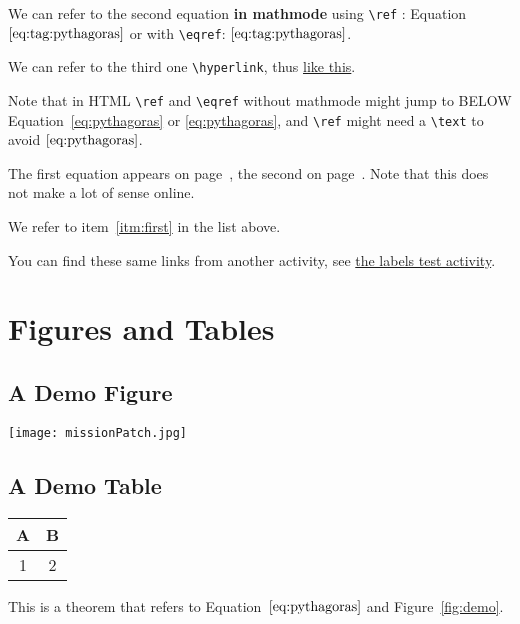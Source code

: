 \documentclass{ximera}
\begin{document}
We can refer to the second equation \textbf{in mathmode} using \verb|\ref| : Equation~$\text{\ref{eq:tag:pythagoras}}$ or with \verb|\eqref|: $\eqref{eq:tag:pythagoras}$.

We can refer to the third one  \verb|\hyperlink|, thus \hyperlink{ht:pythagoras}{like this}.

Note that in HTML \verb|\ref| and \verb|\eqref| without mathmode might jump to BELOW Equation~\ref{eq:pythagoras} or \eqref{eq:pythagoras}, and
\verb|\ref| might need a \verb|\text| to avoid $\ref{eq:pythagoras}$.

The first equation appears on page~\pageref{eq:pythagoras}, the second on page~\pageref{eq:tag:pythagoras}. 
Note that this does not make a lot of sense online.

We refer to item~\ref{itm:first} in the list above.

You can find these same links from another activity, see \hyperlink{xim:labelsFromOtherActivity}{the labels test activity}.

\section{Figures and Tables}

\subsection{A Demo Figure}
\label{sec:fig}

\begin{image}[0.3\textwidth]
  \centering
  \texttt{[image: missionPatch.jpg]} %
\end{image}
  \label{fig:demo}

\subsection{A Demo Table}

{
  \centering
  \begin{tabular}{|c|c|}
    \hline
    A & B \\
    \hline
    1 & 2 \\
    \hline
  \end{tabular}
  \label{tab:example}
}

 \begin{theorem} \label{thm:1}
  
  This is a theorem that refers to Equation~$\eqref{eq:pythagoras}$ and Figure~\ref{fig:demo}.

  
 \end{theorem}
\end{document}
